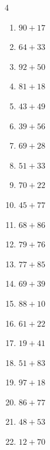 \begin{multicols}{4}
\begin{enumerate}
  \item $90+17$
        \phantom{$=107$}

  \item $64+33$
        \phantom{$=97$}

  \item $92+50$
        \phantom{$=142$}

  \item $81+18$
        \phantom{$=99$}

  \item $43+49$
        \phantom{$=92$}

  \item $39+56$
        \phantom{$=95$}

  \item $69+28$
        \phantom{$=97$}

  \item $51+33$
        \phantom{$=84$}

  \item $70+22$
        \phantom{$=92$}

  \item $45+77$
        \phantom{$=122$}

  \item $68+86$
        \phantom{$=154$}

  \item $79+76$
        \phantom{$=155$}

  \item $77+85$
        \phantom{$=162$}

  \item $69+39$
        \phantom{$=108$}

  \item $88+10$
        \phantom{$=98$}

  \item $61+22$
        \phantom{$=83$}

  \item $19+41$
        \phantom{$=60$}

  \item $51+83$
        \phantom{$=134$}

  \item $97+18$
        \phantom{$=115$}

  \item $86+77$
        \phantom{$=163$}

  \item $48+53$
        \phantom{$=101$}

  \item $12+70$
        \phantom{$=82$}


\end{enumerate}
\end{multicols}
